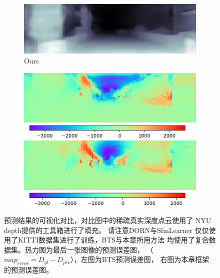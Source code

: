 \begin{figure}[htb]
\begin{subfigure}{0.15\linewidth}
\begin{minipage}[b]{1\linewidth}
  \includegraphics[width=1\linewidth]{figure/kitti_result/2011_09_30_drive_0018_sync_0000000642.png}
  \end{minipage}
  \caption{Ours}
  \end{subfigure}
  \begin{subfigure}{1\linewidth}
    \begin{minipage}[]{0.5\linewidth}
    \centering
     \includegraphics[width=0.95\linewidth]{figure/without_error.png} 
    \end{minipage}
    \begin{minipage}[]{0.5\linewidth}
    \centering
     \includegraphics[width=0.95\linewidth]{figure/our_error.png} 
    \end{minipage}
  \end{subfigure}
  \caption{预测结果的可视化对比，对比图中的稀疏真实深度点云使用了
  NYU depth提供的工具箱进行了填充。
  请注意DORN\cite{FuCVPR18-DORN}与SfmLearner\cite{zhou2017unsupervised}
  仅仅使用了KITTI数据集进行了训练，BTS\cite{bts}与本章所用方法
  均使用了复合数据集。热力图为最后一张图像的预测误差图，
  （$map_{error} = D_{gt} - D_{pre}$），左图为BTS\cite{bts}预测误差图，
  右图为本章框架的预测误差图。}
  \label{KITTI visualization result}
  \end{figure}

